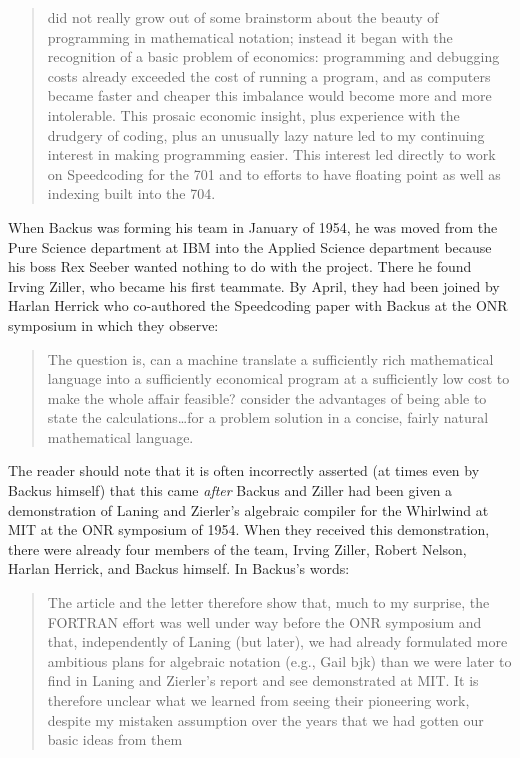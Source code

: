 \begin{quotation}
  \FTN{} did not really grow out of some brainstorm about the beauty of
  programming in mathematical notation; instead it began with the recognition
  of a basic problem of economics: programming and debugging costs already
  exceeded the cost of running a program, and as computers became faster
  and cheaper this imbalance would become more and more intolerable. This
  prosaic economic insight, plus experience with the drudgery of coding, plus
  an unusually lazy nature led to my continuing interest in making
  programming easier.
  This interest led directly to work on Speedcoding for the 701
  and to efforts to have floating point as well as indexing built into the 704.
  \cite{Backus_1980_Programming_in_America_in_1950s}
\end{quotation}

When Backus was forming his team in January of 1954, he was moved from the Pure
Science department at IBM into the Applied Science department because his boss
Rex Seeber wanted nothing to do with the project. There he found Irving Ziller,
who became his first teammate. By April, they had been joined by Harlan Herrick
who co-authored the Speedcoding paper with Backus at the ONR symposium
 in which they observe:

\begin{quotation}
  The question is, can a machine translate a sufficiently rich mathematical
  language into a sufficiently economical program at a sufficiently low cost to
  make the whole affair feasible?  consider the advantages of being
  able to state
  the calculations\dots for a problem solution in a concise, fairly natural
  mathematical language.
\end{quotation}

The reader should note that it is often incorrectly asserted (at times even by
Backus himself\cite{Backus_1980_Programming_in_America_in_1950s}) that this
came \textit{after} Backus and Ziller had been given a demonstration of Laning
and Zierler's algebraic compiler for the Whirlwind at MIT at the ONR symposium
of 1954. When they received this demonstration, there were already four members
of the \FTN{} team, Irving Ziller, Robert Nelson, Harlan Herrick, and Backus
himself. In Backus's words\cite{Backus_1980_Programming_in_America_in_1950s}:

\begin{quotation}
  The article and the letter therefore show that, much to my surprise, the
  FORTRAN effort was well under way before the ONR symposium and that,
  independently of Laning (but later), we had already formulated more ambitious
  plans for algebraic notation (e.g., Gail bjk) than we were later to find in
  Laning and Zierler's report and see demonstrated at MIT. It is therefore
  unclear what we learned from seeing their pioneering work, despite my mistaken
  assumption over the years that we had gotten our basic ideas from them
\end{quotation}

